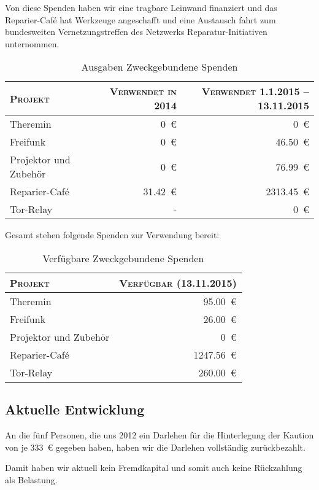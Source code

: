 \documentclass[ngerman]{scrartcl}
\begin{document}
Von diese Spenden haben wir eine tragbare Leinwand finanziert und das Reparier-Café hat Werkzeuge angeschafft und eine Austausch fahrt zum bundesweiten Vernetzungstreffen des Netzwerks Reparatur-Initiativen unternommen.

\begin{table}[h]
	\centering
	\begin{tabular}{l|r|r}
	\toprule
	\textsc{Projekt} & \textsc{Verwendet in 2014} & \textsc{Verwendet 1.1.2015 – 13.11.2015} \\
	\midrule
	Theremin & \num{0}~\euro{} & \num{0}~\euro{} \\
	Freifunk & \num{0}~\euro{} & \num{46,50}~\euro{} \\
	Projektor und Zubehör & \num{0}~\euro{} & \num{76,99}~\euro{} \\
	Reparier-Café & \num{31,42}~\euro{} & \num{2313,45}~\euro{} \\
	Tor-Relay & - & \num{0}~\euro{} \\
\bottomrule
	\end{tabular}
	\caption{Ausgaben Zweckgebundene Spenden}
	\label{table:spenden:aus}
\end{table}

Gesamt stehen folgende Spenden zur Verwendung bereit:
\begin{table}[h]
	\centering
	\begin{tabular}{l|r}
	\toprule
	\textsc{Projekt} & \textsc{Verfügbar (13.11.2015)} \\
	\midrule
	Theremin & \num{95,00}~\euro{} \\
	Freifunk & \num{26,00}~\euro{} \\
	Projektor und Zubehör & \num{0}~\euro{} \\
	Reparier-Café & \num{1247,56}~\euro{} \\
	Tor-Relay & \num{260,00}~\euro{} \\
\bottomrule
	\end{tabular}
	\caption{Verfügbare Zweckgebundene Spenden}
	\label{table:spenden}
\end{table}

\subsection{Aktuelle Entwicklung}
An die fünf Personen, die uns 2012 ein Darlehen für die Hinterlegung der Kaution von je \num{333}~\euro{} gegeben haben, haben wir die Darlehen vollständig zurückbezahlt.

Damit haben wir aktuell kein Fremdkapital und somit auch keine Rückzahlung als Belastung.
\end{document}
